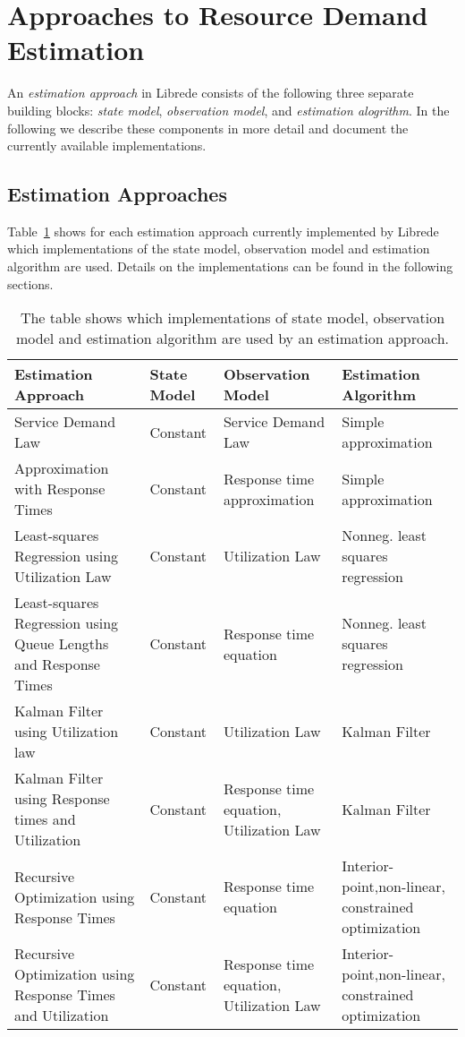 \section{Approaches to Resource Demand Estimation}

An \emph{estimation approach} in Librede consists of the following three separate building blocks: \emph{state model}, \emph{observation model}, and \emph{estimation alogrithm}. In the following we describe these components in more detail and document the currently available implementations.

\subsection{Estimation Approaches}
Table~\ref{tbl:Approaches} shows for each estimation approach currently implemented by Librede which implementations of the state model, observation model and estimation algorithm are used. Details on the implementations can be found in the following sections.

\begin{table}[h!]
\centering
\scriptsize
\label{tbl:Approaches}
\caption{The table shows which implementations of state model, observation model and estimation algorithm are used by an estimation approach.}
\begin{tabular}{p{4cm}p{2cm}p{2cm}p{3cm}}
\hline \textbf{Estimation Approach} & \textbf{State Model} & \textbf{Observation Model} & \textbf{Estimation \newline Algorithm} \\ 
\hline Service Demand Law  & Constant & Service Demand Law & Simple approximation \\ 
\hline Approximation with Response Times & Constant & Response time approximation & Simple approximation \\
\hline Least-squares Regression using Utilization Law & Constant & Utilization Law & Nonneg. least  squares regression\\
\hline Least-squares Regression using Queue Lengths and Response Times & Constant & Response time equation & Nonneg. least  squares regression\\
\hline Kalman Filter using Utilization law & Constant & Utilization Law & Kalman Filter \\ 
\hline Kalman Filter using Response times and Utilization & Constant & Response time equation, Utilization Law & Kalman Filter \\
\hline Recursive Optimization using Response Times & Constant & Response time equation & Interior-point,\newline non-linear, constrained optimization\\
\hline Recursive Optimization using Response Times and Utilization & Constant & Response time equation, Utilization Law & Interior-point,\newline non-linear, constrained optimization\\
\hline
\end{tabular}
\end{table}


